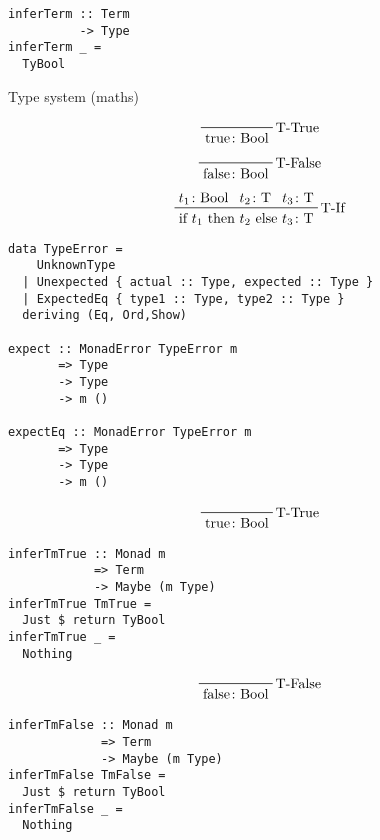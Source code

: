 \documentclass{beamer}
\begin{document}
\begin{frame}[fragile]
  \begin{verbatim}
inferTerm :: Term 
          -> Type
inferTerm _ =
  TyBool
  \end{verbatim}
\end{frame}

\begin{frame}[c]
  \begin{center}
Type system (maths)
  \end{center}
  \begin{displaymath}
    \prftree[r]{T-True}
    {\text{true} \colon \text{Bool}}
  \end{displaymath}
  \begin{displaymath}
    \prftree[r]{T-False}
    {\text{false} \colon \text{Bool}}
  \end{displaymath}
  \begin{displaymath}
    \prftree[r]{T-If}
    {t_1 \colon \text{Bool}}
    {t_2 \colon \text{T}}
    {t_3 \colon \text{T}}
    {\text{if $t_1$ then $t_2$ else $t_3$} \colon \text{T}}
  \end{displaymath}
\end{frame}

\begin{frame}[fragile]
  \begin{verbatim}
data TypeError =
    UnknownType
  | Unexpected { actual :: Type, expected :: Type }
  | ExpectedEq { type1 :: Type, type2 :: Type }
  deriving (Eq, Ord,Show)

expect :: MonadError TypeError m 
       => Type 
       -> Type 
       -> m ()

expectEq :: MonadError TypeError m 
       => Type 
       -> Type 
       -> m ()
  \end{verbatim}
\end{frame}

\begin{frame}[fragile]
  \begin{displaymath}
    \prftree[r]{T-True}
    {\text{true} \colon \text{Bool}}
  \end{displaymath}
  \begin{verbatim}
inferTmTrue :: Monad m 
            => Term 
            -> Maybe (m Type)
inferTmTrue TmTrue =
  Just $ return TyBool
inferTmTrue _ =
  Nothing
  \end{verbatim}
\end{frame}

\begin{frame}[fragile]
  \begin{displaymath}
    \prftree[r]{T-False}
    {\text{false} \colon \text{Bool}}
  \end{displaymath}
  \begin{verbatim}
inferTmFalse :: Monad m 
             => Term 
             -> Maybe (m Type)
inferTmFalse TmFalse =
  Just $ return TyBool
inferTmFalse _ =
  Nothing
  \end{verbatim}
\end{frame}
\end{document}
